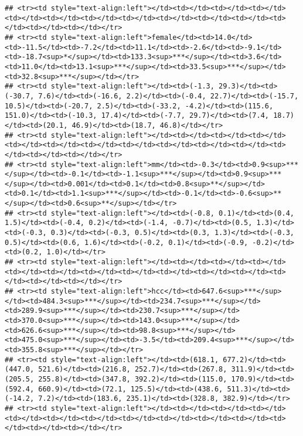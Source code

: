 \documentclass[]{article}
\begin{document}
\begin{verbatim}
## <tr><td style="text-align:left"></td><td></td><td></td><td></td><td></td><td></td><td></td><td></td><td></td><td></td><td></td><td></td><td></td><td></td></tr>
## <tr><td style="text-align:left">female</td><td>14.0</td><td>-11.5</td><td>-7.2</td><td>11.1</td><td>-2.6</td><td>-9.1</td><td>-18.7<sup>*</sup></td><td>133.3<sup>***</sup></td><td>3.6</td><td>11.0</td><td>13.1<sup>***</sup></td><td>33.5<sup>***</sup></td><td>32.8<sup>***</sup></td></tr>
## <tr><td style="text-align:left"></td><td>(-1.3, 29.3)</td><td>(-30.7, 7.6)</td><td>(-16.6, 2.2)</td><td>(-0.4, 22.7)</td><td>(-15.7, 10.5)</td><td>(-20.7, 2.5)</td><td>(-33.2, -4.2)</td><td>(115.6, 151.0)</td><td>(-10.3, 17.4)</td><td>(-7.7, 29.7)</td><td>(7.4, 18.7)</td><td>(20.1, 46.9)</td><td>(18.7, 46.8)</td></tr>
## <tr><td style="text-align:left"></td><td></td><td></td><td></td><td></td><td></td><td></td><td></td><td></td><td></td><td></td><td></td><td></td><td></td></tr>
## <tr><td style="text-align:left">mm</td><td>-0.3</td><td>0.9<sup>***</sup></td><td>-0.1</td><td>-1.1<sup>***</sup></td><td>0.9<sup>***</sup></td><td>0.001</td><td>0.1</td><td>0.8<sup>**</sup></td><td>0.1</td><td>1.1<sup>***</sup></td><td>-0.1</td><td>-0.6<sup>**</sup></td><td>0.6<sup>**</sup></td></tr>
## <tr><td style="text-align:left"></td><td>(-0.8, 0.1)</td><td>(0.4, 1.5)</td><td>(-0.4, 0.2)</td><td>(-1.4, -0.7)</td><td>(0.5, 1.3)</td><td>(-0.3, 0.3)</td><td>(-0.3, 0.5)</td><td>(0.3, 1.3)</td><td>(-0.3, 0.5)</td><td>(0.6, 1.6)</td><td>(-0.2, 0.1)</td><td>(-0.9, -0.2)</td><td>(0.2, 1.0)</td></tr>
## <tr><td style="text-align:left"></td><td></td><td></td><td></td><td></td><td></td><td></td><td></td><td></td><td></td><td></td><td></td><td></td><td></td></tr>
## <tr><td style="text-align:left">hcc</td><td>647.6<sup>***</sup></td><td>484.3<sup>***</sup></td><td>234.7<sup>***</sup></td><td>289.9<sup>***</sup></td><td>230.7<sup>***</sup></td><td>370.0<sup>***</sup></td><td>143.0<sup>***</sup></td><td>626.6<sup>***</sup></td><td>98.8<sup>***</sup></td><td>475.0<sup>***</sup></td><td>-3.5</td><td>209.4<sup>***</sup></td><td>355.8<sup>***</sup></td></tr>
## <tr><td style="text-align:left"></td><td>(618.1, 677.2)</td><td>(447.0, 521.6)</td><td>(216.8, 252.7)</td><td>(267.8, 311.9)</td><td>(205.5, 255.8)</td><td>(347.8, 392.2)</td><td>(115.0, 170.9)</td><td>(592.4, 660.9)</td><td>(72.1, 125.5)</td><td>(438.6, 511.3)</td><td>(-14.2, 7.2)</td><td>(183.6, 235.1)</td><td>(328.8, 382.9)</td></tr>
## <tr><td style="text-align:left"></td><td></td><td></td><td></td><td></td><td></td><td></td><td></td><td></td><td></td><td></td><td></td><td></td><td></td></tr>

\end{verbatim}
\end{document}

